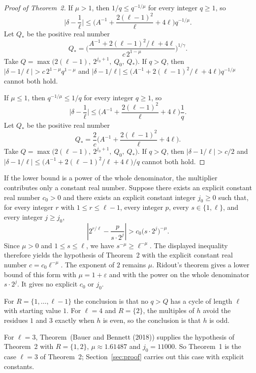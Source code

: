 \documentclass[11pt]{article}
\begin{document}
\begin{proof}[Proof of Theorem~2]
If $\mu > 1$, then $1/q \le q^{-1/\mu}$ for every integer $q \ge 1$, so
\[
\bigl|\delta - \frac1\ell\bigr|
\le \Biggl(A^{-1} + \frac{2(\ell-1)^2}{\ell} + 4\ell\Biggr) q^{-1/\mu}.
\]
Let $Q_*$ be the positive real number
\[
Q_* = \Biggl( \frac{A^{-1} + 2(\ell-1)^2/\ell + 4\ell}{c\, 2^{1-\mu}} \Biggr)^{1/\gamma}.
\]
Take $Q = \max\bigl(2(\ell-1),\ 2^{j_0+1},\ Q_0,\ Q_*\bigr)$.
If $q > Q$, then $\bigl|\delta - 1/\ell\bigr| > c\, 2^{1-\mu} q^{1-\mu}$ and $\bigl|\delta - 1/\ell\bigr| \le \bigl(A^{-1} + 2(\ell-1)^2/\ell + 4\ell\bigr) q^{-1/\mu}$ cannot both hold.

If $\mu \le 1$, then $q^{-1/\mu} \le 1/q$ for every integer $q \ge 1$, so
\[
\bigl|\delta - \frac1\ell\bigr|
\le \Biggl(A^{-1} + \frac{2(\ell-1)^2}{\ell} + 4\ell\Biggr)\frac1q.
\]
Let $Q_*$ be the positive real number
\[
Q_* = \frac2c\Biggl(A^{-1} + \frac{2(\ell-1)^2}{\ell} + 4\ell\Biggr).
\]
Take $Q = \max\bigl(2(\ell-1),\ 2^{j_0+1},\ Q_0,\ Q_*\bigr)$.
If $q > Q$, then $\bigl|\delta - 1/\ell\bigr| > c/2$ and $\bigl|\delta - 1/\ell\bigr| \le \bigl(A^{-1} + 2(\ell-1)^2/\ell + 4\ell\bigr)/q$ cannot both hold.
\end{proof}

If the lower bound is a power of the whole denominator, the multiplier contributes only a constant real number. Suppose there exists an explicit constant real number $c_0 > 0$ and there exists an explicit constant integer $j_0 \ge 0$ such that, for every integer $r$ with $1 \le r \le \ell - 1$, every integer $p$, every $s \in \{1, \ell\}$, and every integer $j \ge j_0$,
\[
\left| 2^{r/\ell} - \frac{p}{s \cdot 2^j} \right| > c_0 \bigl(s \cdot 2^j\bigr)^{-\mu}.
\]
Since $\mu > 0$ and $1 \le s \le \ell$, we have $s^{-\mu} \ge \ell^{-\mu}$. The displayed inequality therefore yields the hypothesis of Theorem~2 with the explicit constant real number $c = c_0 \ell^{-\mu}$. The exponent of $2$ remains $\mu$. Ridout's theorem gives a lower bound of this form with $\mu = 1+\varepsilon$ and with the power on the whole denominator $s \cdot 2^j$. It gives no explicit $c_0$ or $j_0$.

For $R = \{1, \ldots, \ell-1\}$ the conclusion is that no $q > Q$ has a cycle of length $\ell$ with starting value $1$.
For $\ell = 4$ and $R = \{2\}$, the multiples of $h$ avoid the residues $1$ and $3$ exactly when $h$ is even, so the conclusion is that $h$ is odd.

For $\ell = 3$, Theorem~(Bauer and Bennett (2018)) supplies the hypothesis of Theorem~2 with $R = \{1, 2\}$, $\mu \approx 1.61487$ and $j_0 = 11000$.
So Theorem~1 is the case $\ell = 3$ of Theorem~2; Section~\ref{sec:proof} carries out this case with explicit constants.
\end{document}
